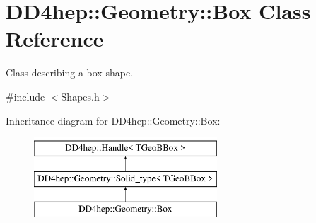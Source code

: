 \hypertarget{class_d_d4hep_1_1_geometry_1_1_box}{}\section{D\+D4hep\+:\+:Geometry\+:\+:Box Class Reference}
\label{class_d_d4hep_1_1_geometry_1_1_box}


Class describing a box shape.  




{\ttfamily \#include $<$Shapes.\+h$>$}

Inheritance diagram for D\+D4hep\+:\+:Geometry\+:\+:Box\+:\begin{figure}[H]
\begin{center}
\leavevmode
\includegraphics[height=3.000000cm]{class_d_d4hep_1_1_geometry_1_1_box}
\end{center}
\end{figure}
